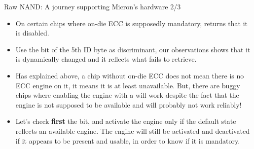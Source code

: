 \documentclass[aspectratio=169,obeyspaces,spaces,hyphens,dvipsnames]{beamer}
\begin{document}
\begin{frame}{Raw NAND: A journey supporting Micron's hardware 2/3}
  \begin{itemize}
  \item [Issue 2] On certain chips where on-die ECC is supposedly
    mandatory,  returns that it is disabled.
  \item [Fix 2] Use the  bit of the 5th ID byte
    as discriminant, our observations shows that it is dynamically
    changed and it reflects what  fails to
    retrieve.
  \item [Issue 3] Has explained above, a chip without on-die ECC does
    not mean there is no ECC engine on it, it means it is at least
    unavailable. But, there are buggy chips where enabling the engine
    with a  will work despite the fact that the
    engine is not supposed to be available and will probably not work
    reliably!
  \item [Fix 3] Let's check {\bf first} the  bit, and
    activate the engine only if the default state reflects an available
    engine. The engine will still be activated and deactivated if it
    appears to be present and usable, in order to know if it is
    mandatory.
  \end{itemize}
\end{frame}
\end{document}
